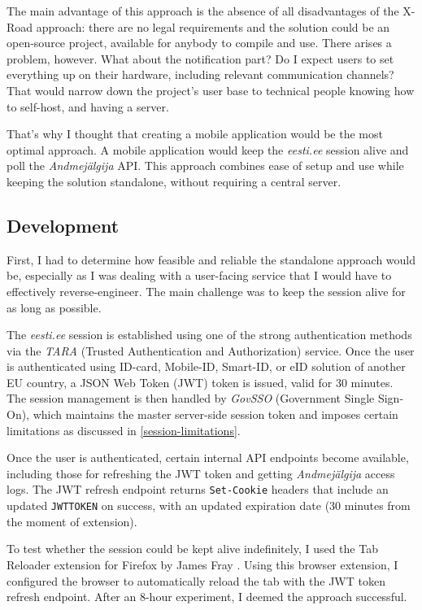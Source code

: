 The main advantage of this approach is the absence of all disadvantages of the X-Road approach: there are no legal requirements and the solution could be an open-source project, available for anybody to compile and use. There arises a problem, however. What about the notification part? Do I expect users to set everything up on their hardware, including relevant communication channels? That would narrow down the project's user base to technical people knowing how to self-host, and having a server.

That's why I thought that creating a mobile application would be the most optimal approach. A mobile application would keep the \textit{eesti.ee} session alive and poll the \textit{Andmejälgija} API. This approach combines ease of setup and use while keeping the solution standalone, without requiring a central server.

\subsection{Development}

First, I had to determine how feasible and reliable the standalone approach would be, especially as I was dealing with a user-facing service that I would have to effectively reverse-engineer. The main challenge was to keep the session alive for as long as possible.

The \textit{eesti.ee} session is established using one of the strong authentication methods via the \textit{TARA} (Trusted Authentication and Authorization) service. Once the user is authenticated using ID-card, Mobile-ID, Smart-ID, or eID solution of another EU country, a JSON Web Token (JWT) token is issued, valid for 30 minutes. The session management is then handled by \textit{GovSSO} (Government Single Sign-On), which maintains the master server-side session token and imposes certain limitations as discussed in \ref{session-limitations}.

Once the user is authenticated, certain internal API endpoints become available, including those for refreshing the JWT token and getting \textit{Andmejälgija} access logs. The JWT refresh endpoint returns \texttt{Set-Cookie} headers that include an updated \texttt{JWTTOKEN} on success, with an updated expiration date (30 minutes from the moment of extension).

To test whether the session could be kept alive indefinitely, I used the Tab Reloader extension for Firefox by James Fray \cite{tab-reloader-addon}. Using this browser extension, I configured the browser to automatically reload the tab with the JWT token refresh endpoint. After an 8-hour experiment, I deemed the approach successful.

